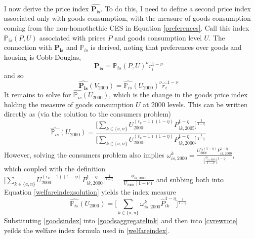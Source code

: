 \documentclass[]{article}
\theoremstyle{plain}
\begin{document}
\paragraph*{}
I now derive the price index $\hat{\mathbf{P_{is}}}$. To do this, I need to define a second price index associated only with goods consumption, with the measure of goods consumption coming from the non-homothethic CES in Equation \eqref{preferences}. Call this index $\mathbb{P}_{is}(P, U)$ associated with prices $P$ and goods consumption level $U$. The connection with $\mathbf{P_{is}}$ and $\mathbb{P}_{is}$ is derived, noting that preferences over goods and housing is Cobb Douglas,
\begin{equation}
	\mathbf{P_{is}} = \mathbb{P}_{is}(P, U)^{\nu}r_{i}^{1-\nu}
\end{equation} 
and so
\begin{equation}\label{goodsaggregatelink}
	\hat{\mathbf{P_{is}}}(V_{2000}) = \hat{\mathbb{P}_{is}}( U_{2000})^{\nu}\hat{r_{i}}^{1-\nu}
\end{equation} 
It remains to solve for $\hat{\mathbb{P}_{is}}( U_{2000})$, which is the change in the goods price index holding the measure of goods consumption $U$ at 2000 levels. This can be written directly as (via the solution to the consumers problem)
\begin{equation}\label{welfareindexsolution}
\hat{\mathbb{P}_{is}}(U_{2000}) =	\frac{\bigg[\sum_{k \in \{a, n\}}U_{2000}^{(\epsilon_{k} - 1)(1-\eta)}P_{ik, 2005}^{1-\eta}\bigg]^{\frac{1}{1-\eta}}}{\bigg[\sum_{k \in \{a, n\}}U_{2000}^{(\epsilon_{k} - 1)(1-\eta)}P_{ik, 2000}^{1-\eta}\bigg]^{\frac{1}{1-\eta}}}
\end{equation}
However, solving the consumers problem also implies $\omega^{k}_{is, 2000} = \frac{U_{2000}^{\epsilon_{k} (1-\eta)}P_{ik, 2000}^{1-\eta}}{\bigg[\frac{\phi_{is, 2005}}{1-\nu}\bigg]^{1-\eta}}$, which coupled with the definition $\bigg[\sum_{k \in \{a, n\}}U_{2000}^{(\epsilon_{k} - 1)(1-\eta)}P_{ik, 2000}^{1-\eta}\bigg]^{\frac{1}{1-\eta}} = \frac{\phi_{is, 2000}}{U_{2000}(1-\nu)}$  and subbing both into Equation \eqref{welfareindexsolution} yields the index measure 
\begin{equation}\label{goodsindex}
\hat{\mathbb{P}_{is}}(U_{2000}) = \bigg[\sum_{k \in \{a, n\}}\omega_{is, 2000}^{k}\hat{P}_{ik}^{1-\eta}\bigg]^{\frac{1}{1-\eta}}
\end{equation}
Substituting \eqref{goodsindex} into \eqref{goodsaggregatelink} and then into \eqref{cvrewrote} yeilds the welfare index formula used in \eqref{welfareindex}.
\end{document}
